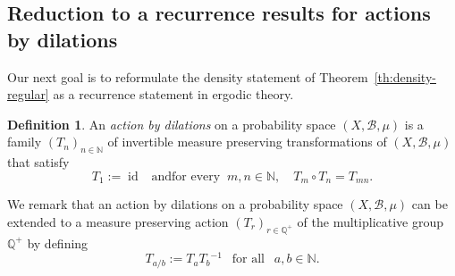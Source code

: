 \documentclass[11pt]{amsart}
\theoremstyle{definition}
\newtheorem*{definition}{Definition}
\begin{document}
\subsection{Reduction to a recurrence results for actions by dilations}\label{SS:actdil}
 Our next goal is
to reformulate the density statement of Theorem~\ref{th:density-regular}
as a recurrence statement in ergodic theory.

\begin{definition}
An \emph{action by dilations} on a probability space $(X,{{\mathcal B}},\mu)$
is a family  $(T_n)_{n\in{{\mathbb N}}}$ of invertible measure preserving
transformations of $(X,{{\mathcal B}},\mu)$ that satisfy
$$ T_1:=\operatorname{id} \ \ \text{ and
}\text{for every }\ m,n\in{{\mathbb N}},\quad T_m\circ T_n=T_{mn}. $$
\end{definition}
We remark  that an action by dilations on a probability space $(X,{{\mathcal B}},\mu)$
can be extended to a measure preserving action $(T_r)_{r\in{{\mathbb Q}}^+}$ of the multiplicative group ${{\mathbb Q}}^+$
by defining
$$
T_{a/b}:=T_aT_b{^{-1}}\ \ \text{ for all }\ \  a,b\in{{\mathbb N}}.
$$
\end{document}
